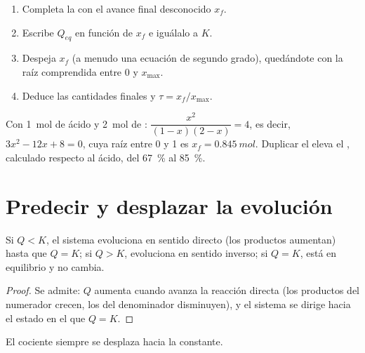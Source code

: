 \begin{method}\label{met:g12:equilibrium:final}
\begin{enumerate}
  \item Completa la  con el avance final desconocido
        $x_f$.
  \item Escribe $Q_{eq}$ en función de $x_f$ e iguálalo a $K$.
  \item Despeja $x_f$ (a menudo una ecuación de segundo grado),
        quedándote con la raíz comprendida entre 0 y $x_{\max}$.
  \item Deduce las cantidades finales y $\tau = x_f/x_{\max}$.
\end{enumerate}
\end{method}

\begin{example}\label{ex:g12:equilibrium:excess}
Con \qty{1}{mol} de ácido y \qty{2}{mol} de :
$\dfrac{x^2}{(1-x)(2-x)} = 4$, es decir, $3x^2 - 12x + 8 = 0$, cuya raíz
entre 0 y 1 es $x_f = \qty{0.845}{mol}$. Duplicar el  eleva el
, calculado respecto al ácido, del \qty{67}{\percent} al
\qty{85}{\percent}.
\end{example}

\section{Predecir y desplazar la evolución}

\begin{proposition}\label{prop:g12:equilibrium:direction}
Si $Q < K$, el sistema evoluciona en sentido directo (los productos
aumentan) hasta que $Q = K$; si $Q > K$, evoluciona en sentido inverso;
si $Q = K$, está en equilibrio y no cambia.
\end{proposition}

\begin{proof}
Se admite: $Q$ aumenta cuando avanza la reacción directa (los productos
del numerador crecen, los  del denominador disminuyen), y el
sistema se dirige hacia el estado en el que $Q = K$.
\end{proof}

\begin{omfigure}

{\small El cociente siempre se desplaza hacia la constante.}
\end{omfigure}

